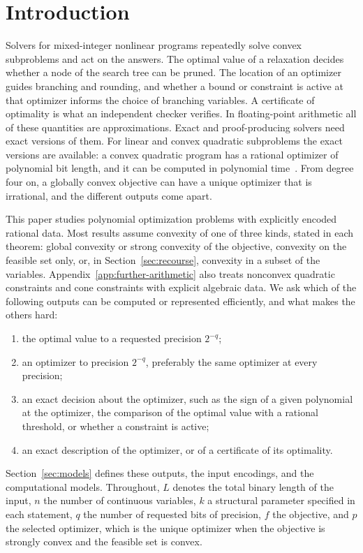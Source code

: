 \section{Introduction}
\label{sec:intro}

Solvers for mixed-integer nonlinear programs repeatedly solve convex
subproblems and act on the answers. The optimal value of a relaxation
decides whether a node of the search tree can be pruned. The location of an
optimizer guides branching and rounding, and whether a bound or constraint is
active at that optimizer informs the choice of branching variables. A
certificate of optimality is what an independent checker verifies. In
floating-point arithmetic all of these quantities are approximations. Exact
and proof-producing solvers need exact versions of them. For linear and
convex quadratic subproblems the exact versions are available: a convex
quadratic program has a rational optimizer of polynomial bit length, and it
can be computed in polynomial time~\cite{KozlovTarasovKhachiyan1980}. From
degree four on, a globally convex objective can have a unique optimizer that
is irrational, and the different outputs come apart.

This paper studies polynomial optimization problems with explicitly encoded
rational data. Most results assume convexity of one of three kinds, stated in
each theorem: global convexity or strong convexity of the objective,
convexity on the feasible set only, or, in Section~\ref{sec:recourse},
convexity in a subset of the variables. Appendix~\ref{app:further-arithmetic}
also treats nonconvex quadratic constraints and cone constraints with
explicit algebraic data. We ask which of the following
outputs can be computed or represented efficiently, and what makes the
others hard:
\begin{enumerate}[label=(\roman*)]
\item the optimal value to a requested precision $2^{-q}$;
\item an optimizer to precision $2^{-q}$, preferably the same optimizer at
  every precision;
\item an exact decision about the optimizer, such as the sign of a given
  polynomial at the optimizer, the comparison of the optimal value with a
  rational threshold, or whether a constraint is active;
\item an exact description of the optimizer, or of a certificate of its
  optimality.
\end{enumerate}
Section~\ref{sec:models} defines these outputs, the input encodings, and the
computational models. Throughout, $L$ denotes the total binary length of the
input, $n$ the number of continuous variables, $k$ a structural parameter
specified in each statement, $q$ the number of requested bits of precision,
$f$ the objective, and $p$ the selected optimizer, which is the unique
optimizer when the objective is strongly convex and the feasible set is
convex.

